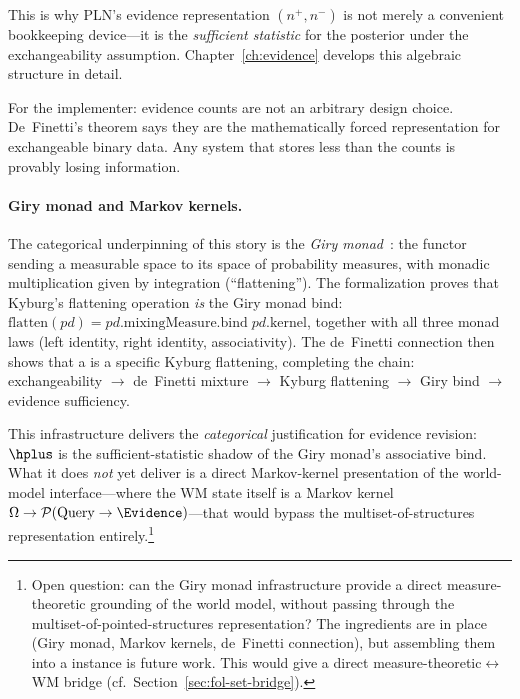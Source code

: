 \documentclass[11pt,openany]{report}
\begin{document}
This is why PLN's evidence representation $(n^+, n^-)$ is not merely a
convenient bookkeeping device---it is the \emph{sufficient statistic} for
the posterior under the exchangeability assumption.  Chapter~\ref{ch:evidence}
develops this algebraic structure in detail.

For the implementer: evidence counts are not an arbitrary design
choice.  De~Finetti's theorem says they are the mathematically forced
representation for exchangeable binary data.  Any system that stores
less than the counts is provably losing information.

\paragraph{Giry monad and Markov kernels.}
The categorical underpinning of this story is the \emph{Giry
monad}~\cite{Giry1982}: the functor sending a measurable space to its
space of probability measures, with monadic multiplication given by
integration (``flattening'').  The formalization proves that Kyburg's
flattening operation \emph{is} the Giry monad bind:
$\mathrm{flatten}(\mathit{pd}) =
\mathit{pd}.\mathrm{mixingMeasure}.\mathrm{bind}\;
\mathit{pd}.\mathrm{kernel}$,
together with all three monad laws (left identity, right identity,
associativity).  The de~Finetti connection then shows that a
 is a specific Kyburg flattening, completing
the chain: exchangeability $\to$ de~Finetti mixture $\to$ Kyburg
flattening $\to$ Giry bind $\to$ evidence sufficiency.

This infrastructure delivers the \emph{categorical} justification for
evidence revision: $\hplus$ is the sufficient-statistic shadow of the
Giry monad's associative bind.  What it does \emph{not} yet deliver
is a direct Markov-kernel presentation of the world-model
interface---where the WM state itself is a Markov kernel
$\Omega \to \mathcal{P}(\mathrm{Query} \to \Evidence)$---that would
bypass the multiset-of-structures representation entirely.\footnote{Open
question: can the Giry monad infrastructure provide a direct
measure-theoretic grounding of the world model, without passing
through the multiset-of-pointed-structures representation?  The
ingredients are in place (Giry monad, Markov kernels, de~Finetti
connection), but assembling them into a
 instance is future work.
This would give a direct measure-theoretic$\leftrightarrow$WM bridge
(cf.\ Section~\ref{sec:fol-set-bridge}).}
\end{document}

